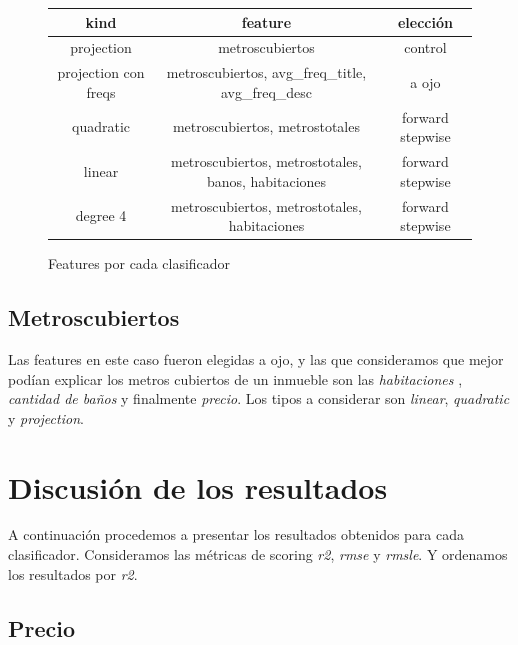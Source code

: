     \begin{figure}[H]
    \centering
    \begin{tabular}{ |c|c|c| } 
    \hline
    kind                    & feature       & elección \\ \hline
    projection              & metroscubiertos & control \\ \hline
    projection con freqs    & metroscubiertos, avg\_freq\_title, avg\_freq\_desc & a ojo \\ \hline
    quadratic               & metroscubiertos, metrostotales & forward stepwise \\ \hline
    linear                  & metroscubiertos, metrostotales, banos, habitaciones & forward stepwise \\ \hline
    degree 4                & metroscubiertos, metrostotales, habitaciones & forward stepwise \\ \hline
    \end{tabular}
    \caption{Features por cada clasificador}
    \end{figure}
    
    \subsection{Metroscubiertos}
    
    Las features en este caso fueron elegidas a ojo, y las que consideramos que mejor podían explicar los metros cubiertos de un inmueble son las \textit{habitaciones}
    , \textit{cantidad de baños} y finalmente \textit{precio}. Los tipos a considerar son \textit{linear}, \textit{quadratic} y \textit{projection}.

\section{Discusión de los resultados}

A continuación procedemos a presentar los resultados obtenidos para cada clasificador. Consideramos las métricas de scoring \textit{r2}, \textit{rmse} y \textit{rmsle}. Y ordenamos los resultados por \textit{r2}.

\subsection{Precio}

